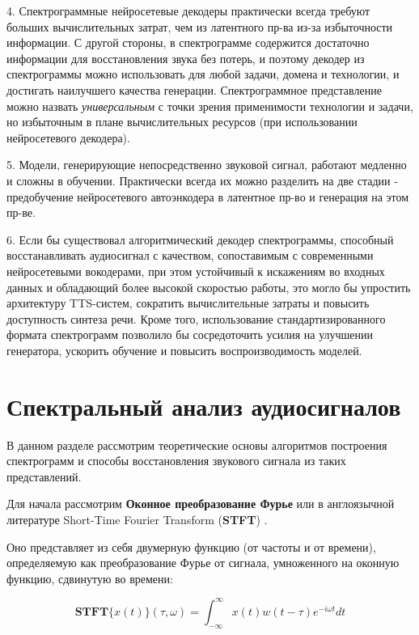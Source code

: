 4. Спектрограммные нейросетевые декодеры практически всегда требуют больших вычислительных затрат, чем из латентного пр-ва из-за избыточности информации. 
С другой стороны, в спектрограмме содержится достаточно информации для восстановления звука без потерь, 
и поэтому декодер из спектрограммы можно использовать для любой задачи, домена и технологии, и достигать наилучшего качества генерации.
Спектрограммное представление можно назвать \textit{универсальным} с точки зрения применимости технологии и задачи, но избыточным в плане вычислительных ресурсов 
(при использовании нейросетевого декодера).

5. Модели, генерирующие непосредственно звуковой сигнал, работают медленно и сложны в обучении. Практически всегда их можно разделить на две стадии - предобучение нейросетевого автоэнкодера в латентное пр-во и генерация на этом пр-ве.

6. Если бы существовал алгоритмический декодер спектрограммы, способный восстанавливать аудиосигнал с качеством, 
сопоставимым с современными нейросетевыми вокодерами, при этом устойчивый к искажениям во входных данных и обладающий более высокой скоростью работы, 
это могло бы упростить архитектуру TTS-систем, сократить вычислительные затраты и повысить доступность синтеза речи. 
Кроме того, использование стандартизированного формата спектрограмм позволило бы сосредоточить усилия на улучшении генератора, 
ускорить обучение и повысить воспроизводимость моделей.


\section{Спектральный анализ аудиосигналов}
В данном разделе рассмотрим теоретические основы алгоритмов построения спектрограмм и способы восстановления звукового сигнала из таких представлений.

Для начала рассмотрим \textbf{Оконное преобразование Фурье} или в англоязычной литературе Short-Time Fourier Transform (\textbf{STFT}) \cite{STFT}.

Оно представляет из себя двумерную функцию (от частоты и от времени), определяемую как преобразование Фурье от сигнала, умноженного на оконную функцию, сдвинутую во времени:

\begin{equation}
  \textbf{STFT}\{x(t)\} (\tau, \omega) = \int_{-\infty}^\infty x(t) w(t - \tau) e^{-i\omega t} dt
  \label{eq:stft_cont}
\end{equation}

